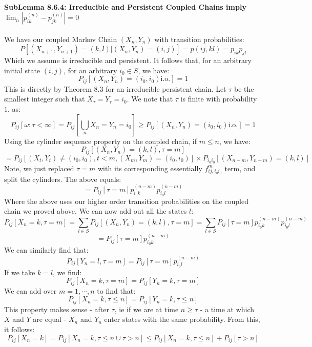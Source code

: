 \documentclass[12pt,a4paper]{article}
\newcommand{\1}[1]{\mathbbm{1}\left\{ #1 \right\}}
\newcommand{\io}{\text{i.o.}}
\begin{document}
\paragraph{SubLemma 8.6.4: Irreducible and Persistent Coupled Chains imply $\lim_n |p_{ik}^{(n)} - p_{jk}^{(n)}| = 0$} We have our coupled Markov Chain $(X_n, Y_n)$ with transition probabilities:
$$
	P\left[(X_{n+1}, Y_{n+1}) = (k, l) | (X_n, Y_n) = (i, j)\right] = p(ij, kl) = p_{ik}p_{jl}
$$
Which we assume is irreducible and persistent. It follows that, for an arbitrary initial state $(i,j)$, for an arbitrary $i_0 \in S$, we have:
$$
	P_{ij}\left[(X_n, Y_n) = (i_0, i_0) \io\right] = 1
$$
This is directly by Theorem 8.3 for an irreducible persistent chain. Let $\tau$ be the smallest integer such that $X_\tau = Y_\tau = i_0$. We note that $\tau$ is finite with probability $1$, as:
$$
	P_{ij}\left[\omega : \tau < \infty\right] =
	P_{ij}\left[\bigcup_n X_n = Y_n = i_0\right] \geq P_{ij}\left[(X_n, Y_n) = (i_0, i_0) \io\right] = 1
$$
Using the cylinder sequence property on the coupled chain, if $m \leq n$, we have:
$$
	P_{ij}\left[(X_n, Y_n) = (k,l), \tau = m\right]
$$
$$
	=
	P_{ij}\left[(X_t, Y_t) \neq (i_0, i_0), t < m, (X_m, Y_m) = (i_0, i_0)\right] \times
	P_{i_0i_0}\left[(X_{n - m}, Y_{n - m}) = (k, l)\right]
$$
Note, we just replaced $\tau = m$ with its corresponding essentially $f_{ij,i_0i_0}^m$ term, and split the cylinders. The above equals:
$$
	= P_{ij}\left[\tau = m\right]p_{i_0k}^{(n-m)}p_{i_0l}^{(n-m)}
$$
Where the above uses our higher order transition probabilities on the coupled chain we proved above. We can now add out all the states $l$:
$$
	P_{ij}\left[X_n = k, \tau = m\right] =
	\sum_{l \in S} P_{ij}\left[(X_n, Y_n) = (k,l), \tau = m\right] =
	\sum_{l \in S} P_{ij}\left[\tau = m\right]p_{i_0k}^{(n-m)}p_{i_0l}^{(n-m)}
$$
$$
	= P_{ij}\left[\tau = m\right]p_{i_0k}^{(n-m)}
$$
We can similarly find that:
$$
	P_{ij}\left[Y_n = l, \tau = m\right] = P_{ij}\left[\tau = m\right]p_{i_0l}^{(n-m)}
$$
If we take $k = l$, we find:
$$
	P_{ij}\left[X_n = k, \tau = m\right] = P_{ij}\left[Y_n = k, \tau = m\right]
$$
We can add over $m = 1, \cdots, n$ to find that:
$$
	P_{ij}\left[X_n = k, \tau \leq n\right] = P_{ij}\left[Y_n = k, \tau \leq n\right]
$$
This property makes sense - after $\tau$, ie if we are at time $n \geq \tau$ - a time at which $X$ and $Y$ are equal - $X_n$ and $Y_n$ enter states with the same probability. From this, it follows:
$$
	P_{ij}\left[X_n = k\right] = P_{ij}\left[X_n = k, \tau \leq n \cup \tau > n\right] \leq
	P_{ij}\left[X_n = k, \tau \leq n\right] + P_{ij}\left[\tau > n\right]
$$
\end{document}
